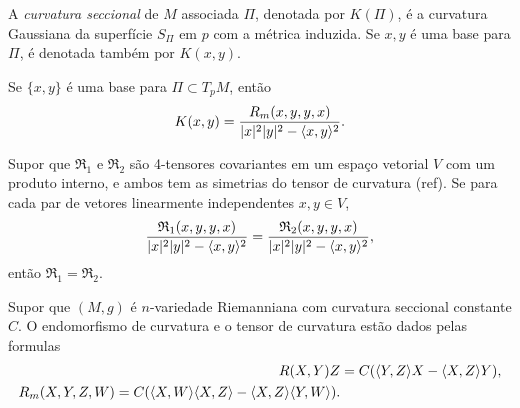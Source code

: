 \begin{definicao}
	A \emph{curvatura seccional} de $M$ associada $\Pi$, denotada por $K(\Pi)$, é a curvatura Gaussiana da superfície $S_{\Pi}$ em $p$ com a métrica induzida. Se $x,y$ é uma base para $\Pi$, é denotada também por $K(x,y)$.
\end{definicao}

\begin{proposicao}
	Se $\{ x,y \}$ é uma base para $\Pi \subset T_p M$, então
	\begin{equation*}
		K(x,y) = \frac{R_m(x,y,y,x)}{|x|^2 |y|^2 - \langle x,y \rangle^2}.
	\end{equation*}
\end{proposicao}

\begin{lema}
	Supor que $\mathfrak{R}_1$ e $\mathfrak{R}_2$ são 4-tensores covariantes em um espaço vetorial $V$ com um produto interno, e ambos tem as simetrias do tensor de curvatura (ref). Se para cada par de vetores linearmente independentes $x,y \in V$,
	\begin{equation*}
		\frac{\mathfrak{R}_1(x,y,y,x)}{|x|^2 |y|^2 - \langle x,y \rangle^2} = \frac{\mathfrak{R}_2(x,y,y,x)}{|x|^2 |y|^2 - \langle x,y \rangle^2},
	\end{equation*}
	então $\mathfrak{R}_1 = \mathfrak{R}_2$.
\end{lema}

\begin{lema}
	Supor que $(M,g)$ é $n$-variedade Riemanniana com curvatura seccional constante $C$. O endomorfismo de curvatura e o tensor de curvatura estão dados pelas formulas
	\begin{align*}
		R(X,Y)Z &= C(\langle Y,Z \rangle X - \langle X,Z \rangle Y),\\
		R_m(X,Y,Z,W) = C(\langle X,W \rangle \langle X,Z \rangle - \langle X,Z \rangle \langle Y,W \rangle).
	\end{align*}
\end{lema}